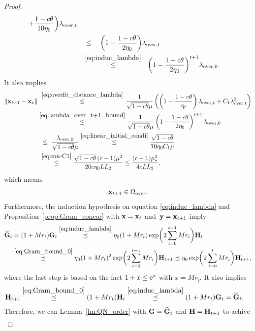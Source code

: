 \documentclass[11pt]{article}
\theoremstyle{plain}
\theoremstyle{definition}
\theoremstyle{remark}
\theoremstyle{plain}
\def\vx{{\bf{x}}}
\def\vy{{\bf{y}}}
\def\mG {{\bf G}}
\def\mH {{\bf H}}
\def\vx {{{\bf x}}}
\def\vy {{{\bf y}}}
\def\G{{\bf G}}
\def\H{{\bf H}}
\def\x{{\bf x}}
\begin{document}
\begin{proof}
\begin{align}
\begin{split}
+\frac{1-c\theta}{10\eta_0}\biggr)\lambda_{\mathrm{over},t}\\
&~~~\leq~~~\biggl(1-\frac{1-c\theta}{2\eta_0}\biggr)
\lambda_{\mathrm{over},t}\\
&~~\,\overset{\eqref{eq:induc_lambda}}{\leq}~~\biggl(1-\frac{1-c\theta}{2\eta_0}\biggr)^{t+1}
\lambda_{\mathrm{over},0}.
\end{split}
\end{align}
It also implies
\begin{align*}
\|\x_{t+1}-\x_*\|
&\,\,\overset{\eqref{eq:overfit_distance_lambda}}{\leq}\,
\frac{1}{\sqrt{1-c\theta}\mu}
\left(\left(1-\frac{1-c\theta}{\eta_t}\right)
\lambda_{\mathrm{over},t}+C_1\lambda_{\mathrm{over},t}^2\right)\\
&\overset{\eqref{eq:lambda_over_t+1_bound}}{\leq}
\frac{1}{\sqrt{1-c\theta}\mu}
\left(1-\frac{1-c\theta}{2\eta_0}\right)^{t+1}
\lambda_{\mathrm{over},0}\\
&\,~\leq~\frac{\lambda_{\mathrm{over},0}}
{\sqrt{1-c\theta}\mu}\overset{\eqref{eq:linear_initial_condi}}{\leq}\frac{\sqrt{1-c\theta}}{10\eta_0 C_1 \mu}\\
&\,\,\overset{\eqref{eq:mu-C1}}{\leq}
\frac{\sqrt{1-c\theta}\,(c-1)\mu^2}{20c\eta_0LL_2}
\leq\frac{(c-1)\mu_*^2}{4cLL_2},
\end{align*}
which means
\begin{align*}
\x_{t+1}\in\Omega_{\mathrm{over}}.    
\end{align*}
Furthermore, 
the induction hypothesis on equation \eqref{eq:induc_lambda} and
Proposition~\ref{prop:Gram_concor} with $\vx=\vx_t$ and~$\vy=\vx_{t+1}$ imply
\begin{align*}
\widetilde{\G}_t
&=(1+Mr_t)\G_t\overset{\eqref{eq:induc_lambda}}{\preceq}
\eta_0(1+Mr_t)
\exp\biggl(2\sum_{i=0}^{t-1}Mr_i\biggr)\H_t\\
&\overset{\eqref{eq:Gram_bound_0}}{\preceq}
\eta_0(1+Mr_t)^2
\exp\biggl(2\sum_{i=0}^{t-1}Mr_i\biggr)\H_{t+1}\preceq\eta_0\exp\biggl(2\sum_{i=0}^{t}Mr_i\biggr)\H_{t+1},
\end{align*}
where the last step is based on the fact $1+x\leq {\rm e}^{x}$ with $x=Mr_{\hat{t}}$.
It also implies
\begin{align*}
\H_{t+1}
&\overset{\eqref{eq:Gram_bound_0}}{\preceq}
(1+Mr_t)\H_t
\overset{\eqref{eq:induc_lambda}}{\preceq}(1+Mr_t)\G_t
=\widetilde{\G}_t.
\end{align*}
Therefore, we can Lemma~\ref{lm:QN_order} with $\mG=\widetilde{\G}_t$ and $\mH=\mH_{t+1}$ to achive
\begin{align}

\end{align}
\end{proof}
\end{document}
